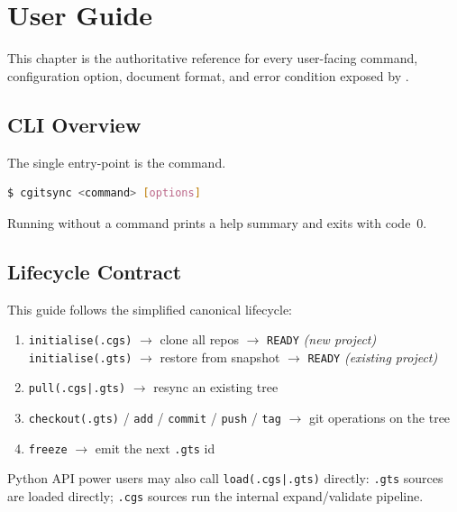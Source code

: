 \chapter{User Guide}
\label{chap:user-guide}

This chapter is the authoritative reference for every user-facing command,
configuration option, document format, and error condition exposed by
\cgspkg{}.

\section{CLI Overview}

The single entry-point is the \cgscli{} command.

\begin{lstlisting}[language=bash]
$ cgitsync <command> [options]
\end{lstlisting}

Running \cgscli{} without a command prints a help summary and exits with
code~0.

\section{Lifecycle Contract}

This guide follows the simplified canonical lifecycle:

\begin{enumerate}
  \item \texttt{initialise(.cgs)} $\rightarrow$ clone all repos $\rightarrow$
        \texttt{READY}  \textit{(new project)}\\
        \texttt{initialise(.gts)} $\rightarrow$ restore from snapshot $\rightarrow$
        \texttt{READY}  \textit{(existing project)}
  \item \texttt{pull(.cgs|.gts)} $\rightarrow$ resync an existing tree
  \item \texttt{checkout(.gts)} / \texttt{add} / \texttt{commit} / \texttt{push} / \texttt{tag}
        $\rightarrow$ git operations on the tree
  \item \texttt{freeze} $\rightarrow$ emit the next \texttt{.gts} id
\end{enumerate}

Python API power users may also call \texttt{load(.cgs|.gts)} directly:
\texttt{.gts} sources are loaded directly; \texttt{.cgs} sources run the
internal expand/validate pipeline.


